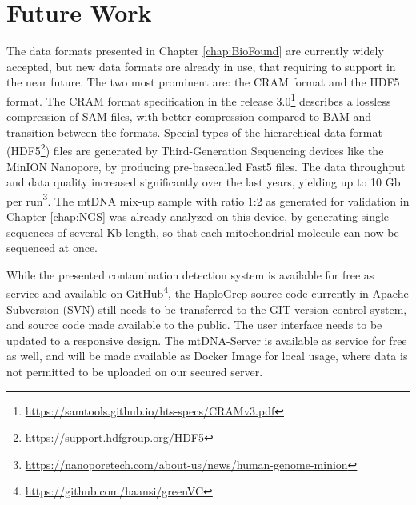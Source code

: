 \section{Future Work}
\label{disc:sec3}
The data formats presented in Chapter \ref{chap:BioFound} are currently widely accepted, but new data formats are already in use, that requiring to support in the near future. The two most prominent are: the CRAM format and the HDF5 format. The CRAM format specification in the release 3.0\footnote{\url{https://samtools.github.io/hts-specs/CRAMv3.pdf}} describes a lossless compression of SAM files, with better compression compared to BAM and transition between the formats. Special types of the hierarchical data format (HDF5\footnote{\url{https://support.hdfgroup.org/HDF5}}) files are generated by Third-Generation Sequencing devices like the MinION Nanopore, by producing pre-basecalled Fast5 files. The data throughput and data quality increased significantly over the last years, yielding up to 10 Gb per run\footnote{\url{https://nanoporetech.com/about-us/news/human-genome-minion}}. The mtDNA mix-up sample with ratio 1:2 as generated for validation in Chapter \ref{chap:NGS} was already analyzed on this device, by generating single sequences of several Kb length, so that each mitochondrial molecule can now be sequenced at once.

While the presented contamination detection system is available for free as service and  available on GitHub\footnote{\url{https://github.com/haansi/greenVC}}, the HaploGrep source code currently in Apache Subversion (SVN) still needs to be transferred to the GIT version control system, and source code made available to the public. The user interface needs to be updated to a responsive design. The mtDNA-Server is available as service for free as well, and will be made available as Docker Image for local usage, where data is not permitted to be uploaded on our secured server.

